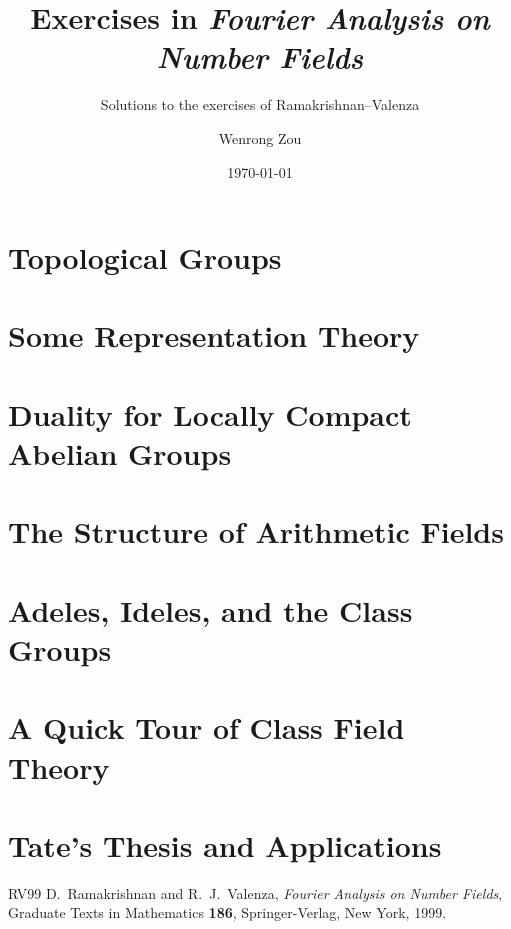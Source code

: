 \documentclass[11pt, a4paper]{scrreprt}
\title{Exercises in \emph{Fourier Analysis on Number Fields}}
\subtitle{Solutions to the exercises of Ramakrishnan--Valenza}
\author{Wenrong Zou}
\date{\today}
\theoremstyle{definition}
\theoremstyle{plain}
\theoremstyle{definition}
\theoremstyle{remark}
\numberwithin{equation}{chapter}
\begin{document}
\maketitle
\tableofcontents


\chapter{Topological Groups}
\label{ch:ch1}


\chapter{Some Representation Theory}
\label{ch:ch2}


\chapter{Duality for Locally Compact Abelian Groups}
\label{ch:ch3}


\chapter{The Structure of Arithmetic Fields}
\label{ch:ch4}


\chapter{Adeles, Ideles, and the Class Groups}
\label{ch:ch5}


\chapter{A Quick Tour of Class Field Theory}
\label{ch:ch6}


\chapter{Tate's Thesis and Applications}
\label{ch:ch7}






\begin{thebibliography}{RV99}
  D.~Ramakrishnan and R.~J.~Valenza,
  \emph{Fourier Analysis on Number Fields},
  Graduate Texts in Mathematics \textbf{186}, Springer-Verlag, New York, 1999.
\end{thebibliography}
\end{document}
